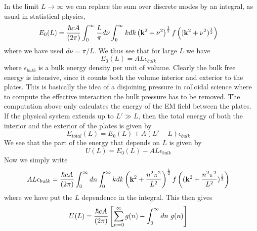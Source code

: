 In the limit $L\to\infty$ we can replace the sum over discrete modes by an integral, as usual in statistical physics, 
\begin{equation}
    E_0(L) = {\hbar c A\over (2\pi)}\int_{0}^\infty  {L\over \pi}d\nu \int_0^\infty   kdk \left({\bf k}^2 + \nu^2\right)^{1\over 2}f\left(({\bf k}^2 + \nu^2)^{1\over 2}\right)
\end{equation}
where we have used $d\nu = \pi/L$. We thus see that for large $L$ we have
\begin{equation}
    E_0(L) = AL \epsilon_{bulk}
\end{equation}
where $\epsilon_{bulk}$ is a bulk energy density per unit of volume. Clearly {\color{red} the bulk free energy is intensive, since it counts both the volume interior and exterior to the plates.} This is basically the idea of a disjoining pressure in colloidal science \cite{stubenrauch_disjoining_2003} where to compute the effective interaction the bulk pressure has to be removed. The computation above only calculates the energy of the EM field between the plates. If the physical system extends up to $L'\gg L$, then the total energy of {\color{red} both the interior and the exterior of the plates} is
given by
\begin{equation}
    E_{total}(L) = E_0(L) + A(L'-L)\epsilon_{bulk}
\end{equation}
We see that the part of the energy that depends on $L$ is given by
\begin{equation}
    U(L) = E_0(L)- AL\epsilon_{bulk}
\end{equation}
Now we simply write 
\begin{equation}
    AL\epsilon_{bulk} = {\hbar c A\over (2\pi)}\int_{0}^\infty  dn \int_0^\infty   kdk \left({\bf k}^2 + {n^2\pi^2\over L^2}\right)^{1\over 2} f\left(({\bf k}^2 + {n^2\pi^2\over L^2})^{1\over 2}\right)
\end{equation}
where we have put the $L$ dependence in the integral. This then gives
\begin{equation}
    U(L) = {\hbar c A\over (2\pi)}\left[\sum_{n=0}^\infty g(n) -\int_0^\infty dn \ g(n)\right]
\end{equation}
 

